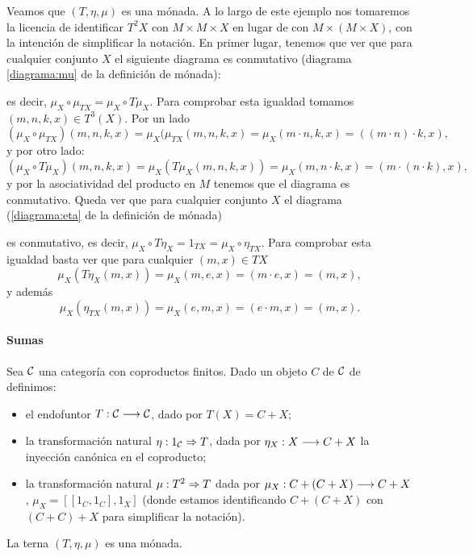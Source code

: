 Veamos que $(T, \eta, \mu)$ es una mónada. A lo largo de este
ejemplo nos tomaremos la licencia de identificar $T^2X$
con $M\times M\times X$ en lugar de con $M \times (M\times X)$,
con la intención de simplificar la notación.
En primer lugar,
tenemos que ver que para cualquier conjunto $X$ el siguiente
diagrama es conmutativo (diagrama \eqref{diagrama:mu} de la definición
de mónada):
\begin{center}
\end{center}
es decir, $\mu_X \circ \mu_{TX} = \mu_X \circ T\mu_X$. Para comprobar
esta igualdad tomamos $(m, n, k, x) \in T^3(X)$.
Por un lado
$$(\mu_X \circ \mu_{TX})(m, n, k, x) = \mu_X(\mu_{TX}(m, n, k, x)
  = \mu_X(m\cdot n, k, x) = ((m\cdot n)\cdot k, x),$$
y por otro lado:
$$(\mu_X \circ T\mu_X)(m, n, k, x) = \mu_X(T\mu_X(m, n, k, x))
  = \mu_X(m, n\cdot k, x) = (m \cdot (n\cdot k), x),$$
y por la asociatividad del producto en $M$ tenemos que
el diagrama es conmutativo.
Queda ver que para cualquier conjunto $X$ el diagrama
(\ref{diagrama:eta} de la definición de mónada)
\begin{center}
\end{center}
es conmutativo, es decir, $\mu_X \circ T\eta_X = 1_{TX} = \mu_X \circ \eta_{TX}$. Para
comprobar esta igualdad basta ver que para cualquier $(m, x) \in TX$
$$\mu_X(T\eta_X(m, x)) = \mu_X(m, e, x) = (m \cdot e, x) = (m, x),$$
y además
$$\mu_X(\eta_{TX}(m, x)) = \mu_X(e, m, x) = (e\cdot m, x) = (m, x).$$

\paragraph{Sumas}
Sea $\mathcal{C}$ una categoría con coproductos finitos. Dado un objeto
$C$ de $\mathcal{C}$ de definimos:

\begin{itemize}
\item el endofuntor $T: \mathcal{C}\longrightarrow \mathcal{C}$, dado por $T(X) = C + X$;
\item la transformación natural $\eta : 1_{\mathcal{C}}\Rightarrow T$, dada por
  $\eta_X : X\longrightarrow C+X$ la inyección canónica en el coproducto;
\item la transformación natural $\mu: T^2\Rightarrow T$ dada por
  $\mu_X : C + (C + X)\longrightarrow C + X$,
  $\mu_X = [[1_C, 1_C], 1_X]$ (donde estamos identificando
  $C + (C + X)$ con $(C + C) + X$ para simplificar la notación).
\end{itemize}
La terna $(T, \eta, \mu)$ es una mónada.

